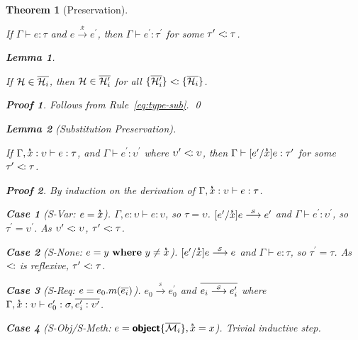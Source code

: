 \documentclass[a4paper, 11pt]{article}
\def\H{\mathcal{H}}
\def\M{\mathcal{M}}
\def\G{\Gamma}
\newcommand{\ctx}[3]{#1 \vdash #2 : #3}
\newcommand{\gctx}[2]{\ctx{\G}{#1}{#2}}
\def\sub{<\kern-1pt:}
\def\bo{{\sffamily\upshape\{}}
\def\bc{{\sffamily\upshape\}}}
\newcommand{\key}[1]{{\sffamily\bfseries#1}}
\newcommand{\object}[1]{\text{\key{object}\bo}#1\text{\bc}}
\newcommand{\type}[1]{\text{\bo}#1\text{\bc}}
\def\rto{\overset{_\mathcal{R}}\longrightarrow}
\def\sto{\overset{_\mathcal{S}}\longrightarrow}
\def\xs{\overset{_\text{\sffamily\bfseries s}}x}
\theoremstyle{theorem}
\newtheorem{theorem}{Theorem}
\theoremstyle{lemma}
\newtheorem{lemma}{Lemma}[theorem]
\theoremstyle{tproof}
\theoremstyle{lproof}
\newtheorem*{lproof}{Proof}
\theoremstyle{tcase}
\theoremstyle{lcase}
\newtheorem*{lcase}{Case}
\begin{document}
\begin{theorem}[Preservation]
\label{th:preservation}

If $\gctx{e}{\tau}$ and $e \rto e^\prime$, then $\gctx{e^\prime}{\tau^\prime}$
for some $\tau^\prime \sub \tau$.

\begin{lemma}
\label{lem:submethod}

If $\H \in \*\H_i*$, then $\H \in \*\H^\prime_i*$ for all
$\type{\*\H^\prime_i*} \sub \type{\*\H_i*}$.

\begin{lproof}
Follows from Rule~\ref{eq:type-sub}. \qed
\end{lproof}

\end{lemma}

\begin{lemma}[Substitution Preservation]
\label{lem:preservation}

If $\ctx{\G, \xs : \upsilon}{e}{\tau}$, and $\gctx{e^\prime}{\upsilon^\prime}$
where $\upsilon^\prime \sub \upsilon$, then
$\gctx{[e^\prime/\xs]e}{\tau^\prime}$ for some $\tau^\prime \sub \tau$.

\begin{lproof}

By induction on the derivation of $\ctx{\G, \xs : \upsilon}{e}{\tau}$.

\begin{lcase}[S-Var: $e = \xs$]
$\ctx{\G, e : \upsilon}{e}{\upsilon}$, so $\tau = \upsilon$.
$[e^\prime/\xs]e \sto e^\prime$ and $\gctx{e^\prime}{\upsilon^\prime}$, so
$\tau^\prime = \upsilon^\prime$.  As
$\upsilon^\prime \sub \upsilon$, $ \tau^\prime \sub \tau$.
\end{lcase}

\begin{lcase}[S-None: $e = y~\mathbf{where}~y \neq \xs$]
$[e^\prime/\xs]e \sto e$ and $\gctx{e}{\tau}$, so
$\tau^\prime = \tau$.  As $\sub$ is reflexive, $\tau^\prime \sub \tau$.
\end{lcase}

\begin{lcase}[S-Req: $e = e_0.m(\*e_i*)$]
$e_0 \sto e^\prime_0$ and $\*e_i \sto e^\prime_i*$ where
$\Gamma, \xs : \upsilon \vdash e^\prime_0 : \sigma, \*e^\prime_i : \upsilon^\prime*$.
\end{lcase}

\begin{lcase}[S-Obj/S-Meth: $e = \object{\*\M_i*}, \xs = x$]
Trivial inductive step.
\end{lcase}


\end{lproof}
\end{lemma}
\end{theorem}
\end{document}
